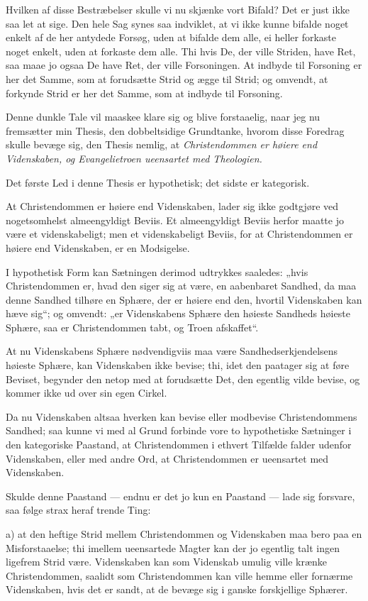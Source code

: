 \documentclass[12pt,a4paper]{book}
\newcommand{\opage}[1]{\marginnote{\footnotesize\textit{[#1]}}}
\begin{document}
Hvilken af disse Bestræbelser skulle vi nu skjænke vort Bifald? Det er
just ikke saa let at sige. Den hele Sag synes saa indviklet, at vi ikke
kunne bifalde noget enkelt af de her antydede Forsøg, uden at bifalde dem
alle, ei heller forkaste noget enkelt, uden at forkaste dem alle. Thi hvis
De, der ville Striden, have Ret, saa maae jo ogsaa De have Ret, der ville
Forsoningen. At indbyde til Forsoning er her det Samme, som at
forudsætte Strid og ægge til Strid; og omvendt, at forkynde Strid er her
det Samme, som at indbyde til Forsoning.

Denne dunkle Tale vil maaskee klare sig og blive forstaaelig, naar jeg nu
fremsætter min Thesis, den dobbeltsidige Grundtanke, hvorom disse Foredrag
skulle bevæge sig, den Thesis nemlig, at \emph{Christendommen er høiere
end Videnskaben, og Evangelietroen ueensartet med Theologien.}

Det første Led i denne Thesis er hypothetisk; det sidste er kategorisk.

At Christendommen er høiere end Videnskaben, lader sig ikke godtgjøre ved
nogetsomhelst almeengyldigt Beviis. Et almeengyldigt Beviis herfor maatte
jo være et videnskabeligt; men et videnskabeligt Beviis, for at
Christendommen er høiere end Videnskaben, er en Modsigelse.

I hypothetisk Form kan Sætningen derimod udtrykkes saaledes: „hvis
Christendommen er, hvad den siger sig at være, en aabenbaret Sandhed, da
maa denne Sandhed tilhøre en Sphære, der er høiere end den, hvortil
Videnskaben kan hæve sig“; og omvendt: „er Videnskabens Sphære den
høieste Sandheds høieste Sphære, saa er Christendommen tabt, og Troen
afskaffet“.

At nu Videnskabens Sphære nødvendigviis maa være Sandhedserkjendelsens
høieste Sphære, kan Videnskaben ikke bevise;
\opage{3} thi, idet den paatager sig at føre Beviset, begynder den netop med at
forudsætte Det, den egentlig vilde bevise, og kommer ikke ud over sin egen
Cirkel.

Da nu Videnskaben altsaa hverken kan bevise eller modbevise
Christendommens Sandhed; saa kunne vi med al Grund forbinde vore to
hypothetiske Sætninger i den kategoriske Paastand, at Christendommen i
ethvert Tilfælde falder udenfor Videnskaben, eller med andre Ord, at
Christendommen er ueensartet med Videnskaben.

Skulde denne Paastand --- endnu er det jo kun en Paastand --- lade sig
forsvare, saa følge strax heraf trende Ting:

a) at den heftige Strid mellem Christendommen og Videnskaben maa bero paa
en Misforstaaelse; thi imellem ueensartede Magter kan der jo egentlig
talt ingen ligefrem Strid være. Videnskaben kan som Videnskab umulig
ville krænke Christendommen, saalidt som Christendommen kan ville hemme
eller fornærme Videnskaben, hvis det er sandt, at de bevæge sig i ganske
forskjellige Sphærer.
\end{document}
